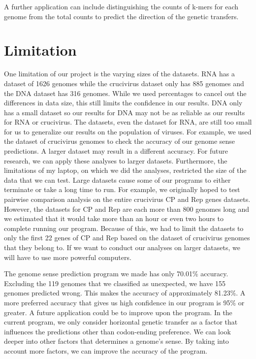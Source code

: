 \documentclass[eng]{ajceam-class}
\begin{document}
A further application can include distinguishing the counts of k-mers for each genome from the total counts to predict the direction of the genetic transfers.

\section{Limitation}

One limitation of our project is the varying sizes of the datasets. RNA has a dataset of 1626 genomes while the crucivirus dataset only has 885 genomes and the DNA dataset has 316 genomes. While we used percentages to cancel out the differences in data size, this still limits the confidence in our results. DNA only has a small dataset so our results for DNA may not be as reliable as our results for RNA or crucivirus. The datasets, even the dataset for RNA, are still too small for us to generalize our results on the population of viruses. For example, we used the dataset of crucivirus genomes to check the accuracy of our genome sense predictions. A larger dataset may result in a different accuracy. For future research, we can apply these analyses to larger datasets. Furthermore, the limitations of my laptop, on which we did the analyses, restricted the size of the data that we can test. Large datasets cause some of our programs to either terminate or take a long time to run. For example, we originally hoped to test pairwise comparison analysis on the entire crucivirus CP and Rep genes datasets. However, the datasets for CP and Rep are each more than 800 genomes long and we estimated that it would take more than an hour or even two hours to complete running our program. Because of this, we had to limit the datasets to only the first 22 genes of CP and Rep based on the dataset of crucivirus genomes that they belong to. If we want to conduct our analyses on larger datasets, we will have to use more powerful computers. 

The genome sense prediction program we made has only 70.01\% accuracy. Excluding the 119 genomes that we classified as unexpected, we have 155 genomes predicted wrong. This makes the accuracy of approximately 81.23\%. A more preferred accuracy that gives us high confidence in our program is 95\% or greater. A future application could be to improve upon the program. In the current program, we only consider horizontal genetic transfer as a factor that influences the predictions other than codon-ending preference. We can look deeper into other factors that determines a genome's sense. By taking into account more factors, we can improve the accuracy of the program.
\end{document}
